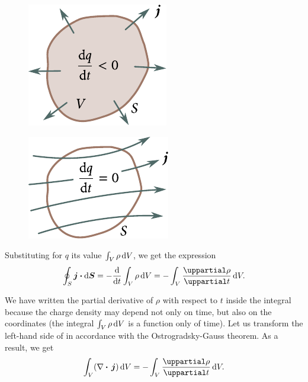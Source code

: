 \begin{figure}[t]
	\begin{minipage}[t]{0.48\linewidth}
		\begin{center}
			\includegraphics[scale=1]{figures/ch_05/fig_5_1.pdf}
			\caption[]{}
			\label{fig:5_1}
		\end{center}
	\end{minipage}
	\hfill{ }%
	\begin{minipage}[t]{0.48\linewidth}
		\begin{center}
			\includegraphics[scale=1]{figures/ch_05/fig_5_2.pdf}
			\caption[]{}
			\label{fig:5_2}
		\end{center}
	\end{minipage}
\vspace{-0.4cm}
\end{figure}

Substituting for $q$ its value $\int_V \rho\,\mathrm{d} V$, we get the expression
\begin{equation}\label{eq:5_9}
    \oint_S \vec{j} \ccdot \deriv{\vec{S}} = - \diff{}{t} \int_V \rho\, \deriv{V} = - \int_V \diffpartial{\rho}{t}\, \deriv{V}.
\end{equation}

\noindent
We have written the partial derivative of $\rho$ with respect to $t$ inside the integral because the charge density may depend not only on time, but also on the coordinates (the integral $\int_V \rho\,\mathrm{d} V$ is a function only of time). Let us transform the left-hand side of  in accordance with the Ostrogradsky-Gauss theorem. As a result, we get
\begin{equation}\label{eq:5_10}
    \int_V (\divop{\vec{j}})\, \deriv{V} = - \int_V \diffpartial{\rho}{t}\, \deriv{V}.
\end{equation}


